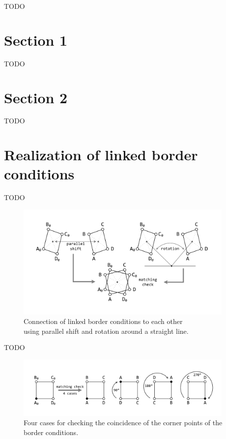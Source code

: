 \documentclass[
11pt,%
tightenlines,%
twoside,%
onecolumn,%
nofloats,%
nobibnotes,%
nofootinbib,%
superscriptaddress,%
noshowpacs,%
centertags]%
{revtex4}
\begin{document}
TODO

\section{Section 1}

TODO

\section{Section 2}

TODO

\section{Realization of linked border conditions}

TODO

\begin{figure}[h]
\setcaptionmargin{5mm}
\onelinecaptionsfalse
\includegraphics[width=0.95\textwidth]{pics/match3.pdf}
\caption{Connection of linked border conditions to each other \\ using parallel shift and rotation around a straight line.}
\label{fig:match3}
\end{figure}

TODO

\begin{figure}[h]
\setcaptionmargin{5mm}
\onelinecaptionstrue
\includegraphics[width=0.95\textwidth]{pics/match.pdf}
\caption{Four cases for checking the coincidence of the corner points of the border conditions.}
\label{fig:match}
\end{figure}
\end{document}

